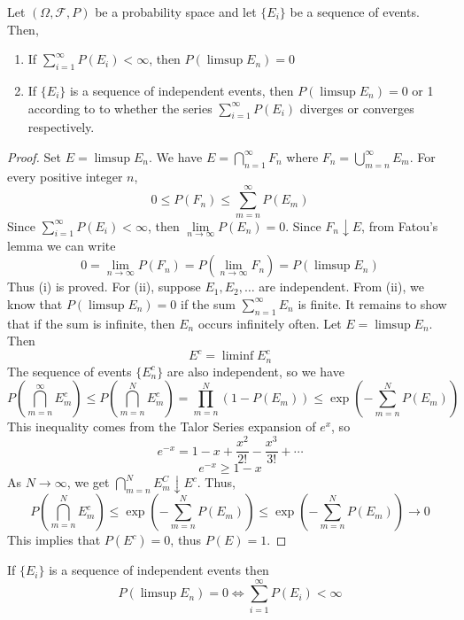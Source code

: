 \documentclass[openany]{report}
\begin{document}
\noindent

\begin{lemma}
    Let $(\Omega, \mathcal{F}, P)$ be a probability space and let $\{E_i\}$ be a sequence of events. Then,
    \begin{enumerate}[label=(\roman*)]
        \item If $\sum\limits_{i=1}^\infty P(E_i) < \infty$, then $P(\limsup E_n )= 0$
        \item If $\{E_i\}$ is a sequence of independent events, then $P(\limsup E_n) = 0$ or 1 according to to whether the series $\sum\limits_{i=1}^\infty P(E_i)$ diverges or converges respectively.
    \end{enumerate}
\end{lemma}
\begin{proof}
    Set $E = \limsup E_n$. We have $E = \bigcap\limits_{n=1}^\infty F_n$ where $F_n = \bigcup\limits_{m=n}^\infty E_m$. For every positive integer $n$, 
    \[0 \leq P(F_n) \leq \sum_{m=n}^\infty P(E_m)\]
    Since $\sum\limits_{i=1}^\infty P(E_i) < \infty$, then $\lim\limits_{n\rightarrow \infty} P(E_n) = 0$. Since $F_n \downarrow E$, from Fatou's lemma we can write 
    \[0 = \lim_{n\rightarrow \infty} P(F_n) = P \left(\lim_{n\rightarrow\infty} F_n\right) = P(\limsup E_n)\]
    Thus (i) is proved. For (ii), suppose $E_1, E_2, \ldots$ are independent. From (ii), we know that $P(\limsup E_n) = 0$  if the sum $\sum_{n=1}^\infty E_n$ is finite. It remains to show that if the sum is infinite, then $E_n$ occurs infinitely often. Let $E = \limsup E_n$. Then 
    \[E^c = \liminf E_n^c\]
    The sequence of events $\{E_n^c\}$ are also independent, so we have 
    \[P\left(\bigcap_{m=n}^\infty E_m^c\right) \leq P\left(\bigcap_{m=n}^N E_m^c\right) = \prod_{m=n}^N (1 - P(E_m)) \leq \exp \left(- \sum_{m=n}^N P(E_m)\right)\]
    This inequality comes from the Talor Series expansion of $e^x$, so
    \[e^{-x} = 1 - x + \frac{x^2}{2!} - \frac{x^3}{3!} + \cdots\] 
    \[e^{-x} \geq 1 - x\]
    As $N \rightarrow \infty$, we get $\bigcap\limits_{m=n}^N E_{m}^C \downarrow E^c$. Thus, 
    \[P\left(\bigcap_{m=n}^N E_m^c\right) \leq \exp\left(-\sum_{m=n}^N P(E_m)\right) \leq \exp \left(-\sum_{m=n}^N P(E_m)\right) \rightarrow 0\]
    This implies that $P(E^c) = 0$, thus $P(E) = 1$.
 \end{proof}
 \begin{corollary}
    If $\{E_i\}$ is a sequence of independent events then 
    \[P(\limsup E_n) =  0 \iff \sum_{i=1}^{\infty} P(E_i) < \infty\]
\end{corollary}
\end{document}
